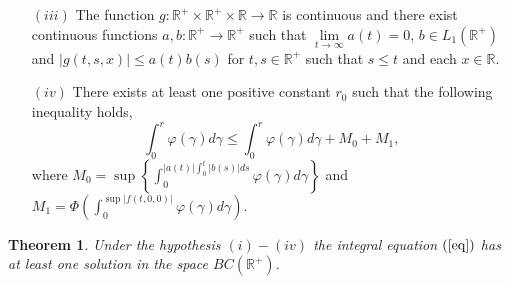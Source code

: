 \documentclass{amsart}
\newtheorem{theorem}{Theorem}
\theoremstyle{plain}
\numberwithin{equation}{section}
\begin{document}
\begin{enumerate}
\item[$\left( iii\right) $] The function $g:\mathbb{R}^{+}\times \mathbb{R}^{+}\times \mathbb{R}\rightarrow \mathbb{R}$ is continuous and there exist
continuous functions $a,b:\mathbb{R}^{+}\rightarrow \mathbb{R}^{+}$ such
that $\lim\limits_{t\rightarrow \infty }a\left( t\right) =0$, $b\in L_{1}(\mathbb{R}^{+})$ and $|g(t,s,x)|\leqslant a(t)b(s)$ for $t,s\in \mathbb{R}^{+}$ such that $s\leqslant t$ and each $x\in \mathbb{R}.$

\item[$\left( iv\right) $] There exists at least one positive constant $r_{0} $ such that the following inequality holds,\begin{equation*}
\int_{0}^{r}\varphi \left( \gamma \right) d\gamma \leqslant
\int_{0}^{r}\varphi \left( \gamma \right) d\gamma +M_{0}+M_{1},
\end{equation*}where $M_{0}=\sup \left\{ \int_{0}^{\left\vert a\left( t\right) \right\vert
\int_{0}^{t}\left\vert b\left( s\right) \right\vert ds}\varphi \left( \gamma
\right) d\gamma \right\} $ and $M_{1}=\Phi \left( \int_{0}^{\sup \left\vert
f\left( t,0,0\right) \right\vert }\varphi \left( \gamma \right) d\gamma
\right) $.
\end{enumerate}

\begin{theorem}
Under the hypothesis $\left( i\right) -\left( iv\right) $ the integral
equation $\left( \text{\ref{eq}}\right) $ has at least one solution in the
space $BC\left( \mathbb{R}^{+}\right) $.
\end{theorem}
\end{document}
